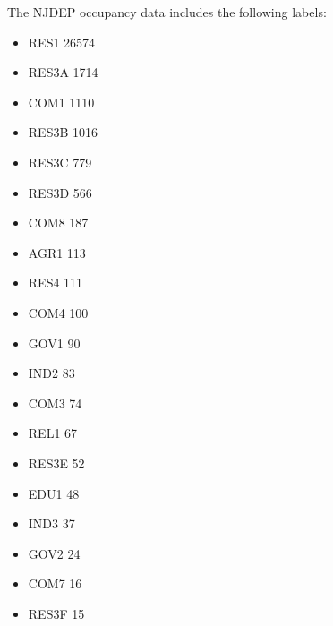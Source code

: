 \documentclass[letterpaper,10pt,english]{sphinxmanual}
\begin{document}
\sphinxAtStartPar
The NJDEP occupancy data includes the following labels:
\begin{itemize}
\item {} 
\sphinxAtStartPar
RES1     26574

\item {} 
\sphinxAtStartPar
RES3A     1714

\item {} 
\sphinxAtStartPar
COM1      1110

\item {} 
\sphinxAtStartPar
RES3B     1016

\item {} 
\sphinxAtStartPar
RES3C      779

\item {} 
\sphinxAtStartPar
RES3D      566

\item {} 
\sphinxAtStartPar
COM8       187

\item {} 
\sphinxAtStartPar
AGR1       113

\item {} 
\sphinxAtStartPar
RES4       111

\item {} 
\sphinxAtStartPar
COM4       100

\item {} 
\sphinxAtStartPar
GOV1        90

\item {} 
\sphinxAtStartPar
IND2        83

\item {} 
\sphinxAtStartPar
COM3        74

\item {} 
\sphinxAtStartPar
REL1        67

\item {} 
\sphinxAtStartPar
RES3E       52

\item {} 
\sphinxAtStartPar
EDU1        48

\item {} 
\sphinxAtStartPar
IND3        37

\item {} 
\sphinxAtStartPar
GOV2        24

\item {} 
\sphinxAtStartPar
COM7        16

\item {} 
\sphinxAtStartPar
RES3F       15


\end{itemize}
\end{document}

